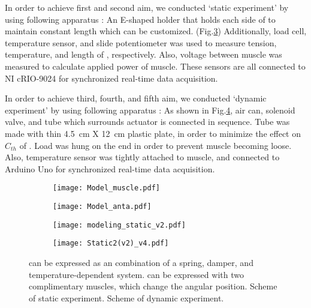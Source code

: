 In order to achieve first and second aim, we conducted `static experiment' by using following apparatus : An E-shaped holder that holds each side of \scp to maintain constant length which can be customized. (Fig.\ref{static_sch}) Additionally, load cell, temperature sensor, and slide potentiometer was used to measure tension, temperature, and length of \scpnospace, respectively. Also, voltage between muscle was measured to calculate applied power of muscle. These sensors are all connected to NI cRIO-9024 for synchronized real-time data acquisition.

In order to achieve third, fourth, and fifth aim, we conducted `dynamic experiment' by using following apparatus : As shown in Fig.\ref{dynamic_sch}, air can, solenoid valve, and tube which surrounds actuator is connected in sequence. 
Tube was made with thin \SI{4.5}{\centi\meter} X \SI{12}{\centi\meter} plastic plate, in order to minimize the effect on $C_{th}$ of \scpnospace.
Load was hung on the end in order to prevent muscle becoming loose. 
Also, temperature sensor was tightly attached to muscle, and connected to Arduino Uno for synchronized real-time data acquisition.



\begin{figure}[t]
	\centering
	\begin{subfigure}[t]{0.25\textwidth}
		\centering\texttt{[image: Model\_muscle.pdf]}
		\caption{\label{ModelMus}}
	\end{subfigure}
	\begin{subfigure}[t]{0.30\textwidth}
		\centering\texttt{[image: Model\_anta.pdf]}
		\caption{\label{ModelAnt}}
	\end{subfigure}
	\begin{subfigure}[t]{0.18\textwidth}
		\centering\texttt{[image: modeling\_static\_v2.pdf]}
		\caption{\label{static_sch}}
	\end{subfigure}
	\begin{subfigure}[t]{0.18\textwidth}
		\centering\texttt{[image: Static2(v2)\_v4.pdf]} %
		\caption{\label{dynamic_sch}}
	\end{subfigure}
	\caption[Modeling of \scp]{ \scp can be expressed as an combination of a spring, damper, and temperature-dependent system.  \Anta can be expressed with two complimentary muscles, which change the angular position.  Scheme of static experiment.  Scheme of dynamic experiment.}
	\label{model+exp_sch}
\end{figure}

